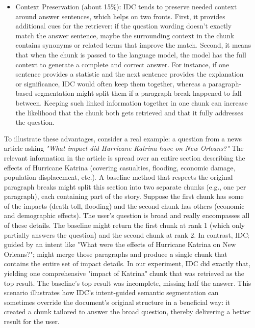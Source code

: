 \documentclass[12pt,a4paper]{report}
\begin{document}
\begin{itemize}
\item Context Preservation (about 15\%): IDC tends to preserve needed context around answer sentences, which helps on two fronts. First, it provides additional cues for the retriever: if the question wording doesn't exactly match the answer sentence, maybe the surrounding context in the chunk contains synonyms or related terms that improve the match. Second, it means that when the chunk is passed to the language model, the model has the full context to generate a complete and correct answer. For instance, if one sentence provides a statistic and the next sentence provides the explanation or significance, IDC would often keep them together, whereas a paragraph-based segmentation might split them if a paragraph break happened to fall between. Keeping such linked information together in one chunk can increase the likelihood that the chunk both gets retrieved and that it fully addresses the question.
\end{itemize}

To illustrate these advantages, consider a real example: a question from a news article asking \textit{"What impact did Hurricane Katrina have on New Orleans?"} The relevant information in the article is spread over an entire section describing the effects of Hurricane Katrina (covering casualties, flooding, economic damage, population displacement, etc.). A baseline method that respects the original paragraph breaks might split this section into two separate chunks (e.g., one per paragraph), each containing part of the story. Suppose the first chunk has some of the impacts (death toll, flooding) and the second chunk has others (economic and demographic effects). The user's question is broad and really encompasses all of these details. The baseline might return the first chunk at rank 1 (which only partially answers the question) and the second chunk at rank 2. In contrast, IDC; guided by an intent like "What were the effects of Hurricane Katrina on New Orleans?"; might merge those paragraphs and produce a single chunk that contains the entire set of impact details. In our experiment, IDC did exactly that, yielding one comprehensive "impact of Katrina" chunk that was retrieved as the top result. The baseline's top result was incomplete, missing half the answer. This scenario illustrates how IDC's intent-guided semantic segmentation can sometimes override the document's original structure in a beneficial way: it created a chunk tailored to answer the broad question, thereby delivering a better result for the user.
\end{document}

